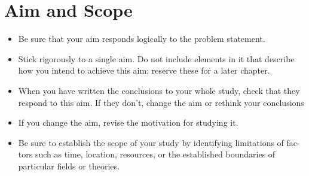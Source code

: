\documentclass[12pt, a4paper]{article}
\begin{document}
\section*{Aim and Scope}
\begin{itemize}
\item Be sure that your aim responds logically to the problem statement.
\item Stick rigorously to a single aim. Do not include elements in it that describe
how you intend to achieve this aim; reserve these for a later chapter.
\item When you have written the conclusions to your whole study, check that they respond to this aim. If they don’t, change the aim or rethink your conclusions
\item If you change the aim, revise the motivation for studying it.
\item 	Be sure to establish the scope of your study by identifying limitations of fac- tors such as time, location, resources, or the established boundaries of particular fields or theories.
\end{itemize}
\begin{thebibliography}{9}
\end{thebibliography}
\end{document}

